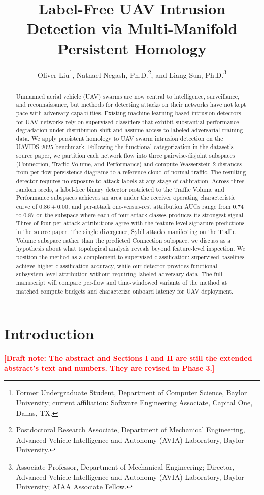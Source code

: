 \documentclass[conf]{new-aiaa}
\title{Label-Free UAV Intrusion Detection via Multi-Manifold Persistent Homology}
\author{Oliver Liu\footnote{Former Undergraduate Student, Department of Computer Science, Baylor University; current affiliation: Software Engineering Associate, Capital One, Dallas, TX.}, 
Natnael Negash, Ph.D.\footnote{Postdoctoral Research Associate, Department of Mechanical Engineering, Advanced Vehicle Intelligence and Autonomy (AVIA) Laboratory, Baylor University.}, 
and Liang Sun, Ph.D.\footnote{Associate Professor, Department of Mechanical Engineering; Director, Advanced Vehicle Intelligence and Autonomy (AVIA) Laboratory, Baylor University; AIAA Associate Fellow.}}
\affil{Baylor University, Waco, TX 76798}
\newcommand{\draftnote}[1]{\par\noindent\textcolor{red}{\textbf{[Draft note: #1]}}\par}
\begin{document}
\maketitle

\begin{abstract}
Unmanned aerial vehicle (UAV) swarms are now central to intelligence, surveillance, and reconnaissance, but methods for detecting attacks on their networks have not kept pace with adversary capabilities. Existing machine-learning-based intrusion detectors for UAV networks rely on supervised classifiers that exhibit substantial performance degradation under distribution shift and assume access to labeled adversarial training data. We apply persistent homology to UAV swarm intrusion detection on the UAVIDS-2025 benchmark. Following the functional categorization in the dataset's source paper, we partition each network flow into three pairwise-disjoint subspaces (Connection, Traffic Volume, and Performance) and compute Wasserstein-2 distances from per-flow persistence diagrams to a reference cloud of normal traffic. The resulting detector requires no exposure to attack labels at any stage of calibration. Across three random seeds, a label-free binary detector restricted to the Traffic Volume and Performance subspaces achieves an area under the receiver operating characteristic curve of $0.86 \pm 0.00$, and per-attack one-versus-rest attribution AUCs range from $0.74$ to $0.87$ on the subspace where each of four attack classes produces its strongest signal. Three of four per-attack attributions agree with the feature-level signature predictions in the source paper. The single divergence, Sybil attacks manifesting on the Traffic Volume subspace rather than the predicted Connection subspace, we discuss as a hypothesis about what topological analysis reveals beyond feature-level inspection. We position the method as a complement to supervised classification: supervised baselines achieve higher classification accuracy, while our detector provides functional-subsystem-level attribution without requiring labeled adversary data. The full manuscript will compare per-flow and time-windowed variants of the method at matched compute budgets and characterize onboard latency for UAV deployment.
\end{abstract}

\section{Introduction}
\draftnote{The abstract and Sections I and II are still the extended abstract's text and numbers. They are revised in Phase 3.}
\end{document}
